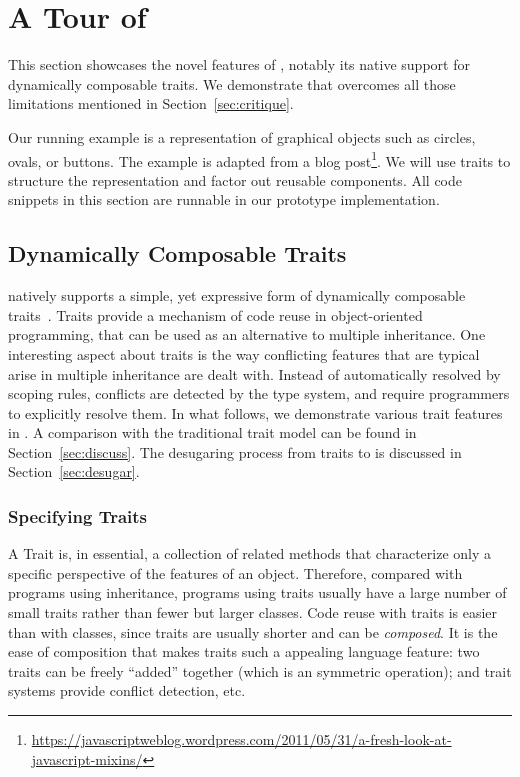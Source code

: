 \section{A Tour of \name}

This section showcases the novel features of \name, notably its native support
for dynamically composable traits. We demonstrate that \name overcomes all those
limitations mentioned in Section~\ref{sec:critique}.

Our running example is a representation of graphical objects such as circles,
ovals, or buttons. The example is adapted from a blog
post\footnote{\url{https://javascriptweblog.wordpress.com/2011/05/31/a-fresh-look-at-javascript-mixins/}}.
We will use traits to structure the representation and factor out reusable
components. All code snippets in this section are runnable in our prototype
implementation.


\subsection{Dynamically Composable Traits}
\label{sec:traits}

\name natively supports a simple, yet expressive form of dynamically composable
traits~\cite{scharli2003traits}. Traits provide a mechanism of code reuse in
object-oriented programming, that can be used as an alternative to multiple
inheritance. One interesting aspect about traits is the way conflicting features
that are typical arise in multiple inheritance are dealt with. Instead of
automatically resolved by scoping rules, conflicts are detected by the type
system, and require programmers to explicitly resolve them. In what follows, we
demonstrate various trait features in \name. A comparison with the traditional
trait model can be found in Section~\ref{sec:discuss}. The desugaring process
from traits to \bname is discussed in Section~\ref{sec:desugar}.

\subsubsection{Specifying Traits}

A Trait is, in essential, a collection of related methods that characterize only
a specific perspective of the features of an object. Therefore, compared with
programs using inheritance, programs using traits usually have a large number of
small traits rather than fewer but larger classes. Code reuse with traits is
easier than with classes, since traits are usually shorter and can be
\textit{composed}. It is the ease of composition that makes traits such a
appealing language feature: two traits can be freely ``added'' together (which
is an symmetric operation); and trait systems provide conflict detection, etc.


